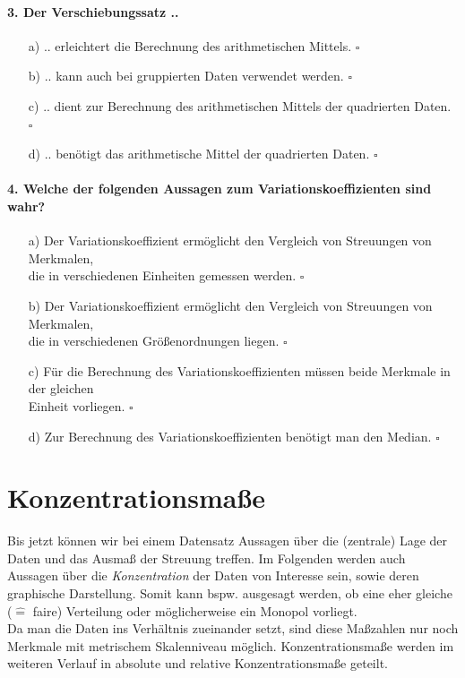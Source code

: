 \documentclass[a4paper]{article}
\begin{document}
\paragraph{3. Der Verschiebungssatz ..}

\begin{itemize}
    \item[a)] .. erleichtert die Berechnung des arithmetischen Mittels. \hfill $\square$
    \item[b)] .. kann auch bei gruppierten Daten verwendet werden. \hfill $\square$
    \item[c)] .. dient zur Berechnung des arithmetischen Mittels der quadrierten Daten. \hfill $\square$
    \item[d)] .. benötigt das arithmetische Mittel der quadrierten Daten. \hfill $\square$
\end{itemize}

\paragraph{4. Welche der folgenden Aussagen zum Variationskoeffizienten sind wahr?}

\begin{itemize}
    \item[a)] Der Variationskoeffizient ermöglicht den Vergleich von Streuungen von Merkmalen,\\die in verschiedenen Einheiten gemessen werden. \hfill $\square$
    \item[b)] Der Variationskoeffizient ermöglicht den Vergleich von Streuungen von Merkmalen,\\die in verschiedenen Größenordnungen liegen. \hfill $\square$
    \item[c)] Für die Berechnung des Variationskoeffizienten müssen beide Merkmale in der gleichen\\Einheit vorliegen. \hfill $\square$
    \item[d)] Zur Berechnung des Variationskoeffizienten benötigt man den Median. \hfill $\square$
\end{itemize}


\clearpage


\section{Konzentrationsmaße}\label{sec:konz}
Bis jetzt können wir bei einem Datensatz Aussagen über die (zentrale) Lage der Daten und das Ausmaß der Streuung treffen. Im Folgenden werden auch Aussagen über die \textit{Konzentration} der Daten von Interesse sein, sowie deren graphische Darstellung. Somit kann bspw. ausgesagt werden, ob eine eher gleiche ($\widehat =$ faire) Verteilung oder möglicherweise ein Monopol vorliegt.\\
Da man die Daten ins Verhältnis zueinander setzt, sind diese Maßzahlen nur noch Merkmale mit  metrischem Skalenniveau möglich. Konzentrationsmaße werden im weiteren Verlauf in absolute und relative Konzentrationsmaße geteilt.
\end{document}
